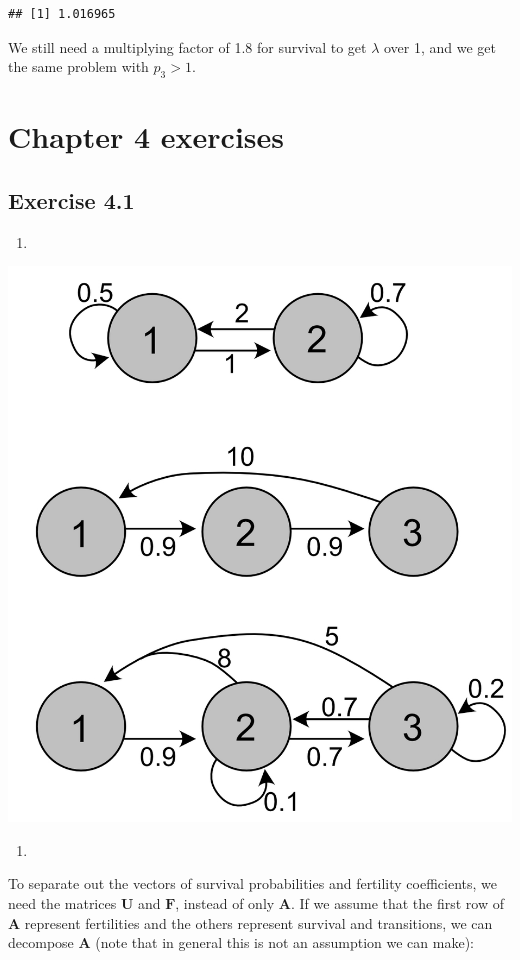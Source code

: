 \documentclass[
]{book}
\providecommand{\tightlist}{%
  \setlength{\itemsep}{0pt}\setlength{\parskip}{0pt}}
\begin{document}
\begin{verbatim}
## [1] 1.016965
\end{verbatim}

We still need a multiplying factor of 1.8 for survival to get \(\lambda\) over 1, and we get the same problem with \(p_3>1\).

\hypertarget{chapter-4-exercises}{%
\section{Chapter 4 exercises}\label{chapter-4-exercises}}

\hypertarget{exercise-4.1-1}{%
\subsection*{Exercise 4.1}\label{exercise-4.1-1}}

\begin{enumerate}
\def\labelenumi{\arabic{enumi}.}
\tightlist
\item
\end{enumerate}

\includegraphics[width=0.6\linewidth]{LifeCycleEx41}

\begin{enumerate}
\def\labelenumi{\arabic{enumi}.}
\setcounter{enumi}{1}
\tightlist
\item
\end{enumerate}

To separate out the vectors of survival probabilities and fertility coefficients, we need the matrices \(\mathbf{U}\) and \(\mathbf{F}\), instead of only \(\mathbf{A}\). If we assume that the first row of \(\mathbf{A}\) represent fertilities and the others represent survival and transitions, we can decompose \(\mathbf{A}\) (note that in general this is not an assumption we can make):
\end{document}
